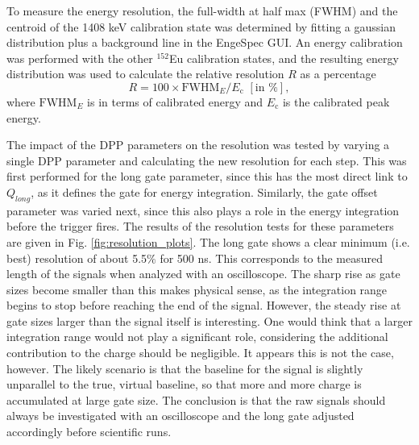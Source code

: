 To measure the energy resolution, the full-width at half max (FWHM) and the centroid of the 1408 keV calibration state was determined by fitting a gaussian distribution plus a background line in the EngeSpec GUI. An energy calibration was performed with the other $^{152}$Eu calibration states, and the resulting energy distribution was used to calculate the relative resolution $R$ as a percentage
\begin{equation}
R = 100 \times \mathrm{FWHM}_{E}/E_{\mathrm{c}} \,\, [\mathrm{in} \, \, \%],
\end{equation}
where $\mathrm{FWHM}_{E}$ is in terms of calibrated energy and $E_{\mathrm{c}}$ is the calibrated peak energy.

The impact of the DPP parameters on the resolution was tested by varying a single DPP parameter and calculating the new resolution for each step. This was first performed for the long gate parameter, since this has the most direct link to $Q_{long}$, as it defines the gate for energy integration. Similarly, the gate offset parameter was varied next, since this also plays a role in the energy integration before the trigger fires. The results of the resolution tests for these parameters are given in Fig. \ref{fig:resolution_plots}. The long gate shows a clear minimum (i.e. best) resolution of about 5.5$\%$ for 500 ns. This corresponds to the measured length of the signals when analyzed with an oscilloscope. The sharp rise as gate sizes become smaller than this makes physical sense, as the integration range begins to stop before reaching the end of the signal. However, the steady rise at gate sizes larger than the signal itself is interesting. One would think that a larger integration range would not play a significant role, considering the additional contribution to the charge should be negligible. It appears this is not the case, however. The likely scenario is that the baseline for the signal is slightly unparallel to the true, virtual baseline, so that more and more charge is accumulated at large gate size. The conclusion is that the raw signals should always be investigated with an oscilloscope and the long gate adjusted accordingly before scientific runs.

